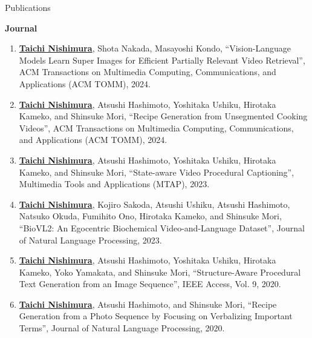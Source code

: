 \begin{rSection}{Publications}

{\bf Journal}
\vspace{-0.15cm}
\begin{enumerate}
    \item \underline{{\bf Taichi Nishimura}}, Shota Nakada, Masayoshi Kondo, ``Vision-Language Models Learn Super Images for Efficient Partially Relevant Video Retrieval'', ACM Transactions on Multimedia Computing, Communications, and Applications (ACM TOMM), 2024.
    \item \underline{{\bf Taichi Nishimura}}, Atsushi Hashimoto, Yoshitaka Ushiku, Hirotaka Kameko, and Shinsuke Mori, ``Recipe Generation from Unsegmented Cooking Videos'', ACM Transactions on Multimedia Computing, Communications, and Applications (ACM TOMM), 2024.
    \item \underline{{\bf Taichi Nishimura}}, Atsushi Hashimoto, Yoshitaka Ushiku, Hirotaka Kameko, and Shinsuke Mori, ``State-aware Video Procedural Captioning'', Multimedia Tools and Applications (MTAP), 2023.
    \item \underline{{\bf Taichi Nishimura}}, Kojiro Sakoda, Atsushi Ushiku, Atsushi Hashimoto, Natsuko Okuda, Fumihito Ono, Hirotaka Kameko, and Shinsuke Mori, ``BioVL2: An Egocentric Biochemical Video-and-Language Dataset'', Journal of Natural Language Processing, 2023.
    \item \underline{{\bf Taichi Nishimura}}, Atsushi Hashimoto, Yoshitaka Ushiku, Hirotaka Kameko, Yoko Yamakata, and Shinsuke Mori, ``Structure-Aware Procedural Text Generation from an Image Sequence'', IEEE Access, Vol. 9, 2020.
    \item \underline{{\bf Taichi Nishimura}}, Atsushi Hashimoto, and Shinsuke Mori, ``Recipe Generation from a Photo Sequence by Focusing on Verbalizing Important Terms'', Journal of Natural Language Processing, 2020.
\end{enumerate}


\end{rSection}
